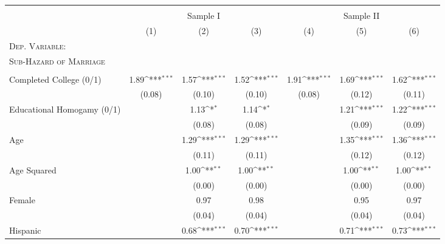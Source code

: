 {\def\sym#1{\ifmmode^{#1}\else\(^{#1}\)\fi}              \begin{tabular}{l*{6}{c}}                          \toprule  
\\[-1.8ex] & \multicolumn{3}{c}{Sample I} & \multicolumn{3}{c}{Sample II} \\ 
\cmidrule(lr){2-4} \cmidrule(lr){5-7} 			
		           &\multicolumn{1}{c}{(1)}  &\multicolumn{1}{c}{(2)}  &\multicolumn{1}{c}{(3)}     &\multicolumn{1}{c}{(4)} &\multicolumn{1}{c}{(5)} &\multicolumn{1}{c}{(6)}         \\             \midrule             \textsc{Dep. Variable:} & & & & & & \\\textsc{Sub-Hazard of Marriage} & & & & & & \\ & & & & & &\\
Completed College (0/1)&     1.89\sym{***}&     1.57\sym{***}&     1.52\sym{***}&     1.91\sym{***}&     1.69\sym{***}&     1.62\sym{***}\\
                &   (0.08)         &   (0.10)         &   (0.10)         &   (0.08)         &   (0.12)         &   (0.11)         \\
Educational Homogamy (0/1)&                  &     1.13\sym{*}  &     1.14\sym{*}  &                  &     1.21\sym{***}&     1.22\sym{***}\\
                &                  &   (0.08)         &   (0.08)         &                  &   (0.09)         &   (0.09)         \\
Age             &                  &     1.29\sym{***}&     1.29\sym{***}&                  &     1.35\sym{***}&     1.36\sym{***}\\
                &                  &   (0.11)         &   (0.11)         &                  &   (0.12)         &   (0.12)         \\
Age Squared     &                  &     1.00\sym{**} &     1.00\sym{**} &                  &     1.00\sym{**} &     1.00\sym{**} \\
                &                  &   (0.00)         &   (0.00)         &                  &   (0.00)         &   (0.00)         \\
Female          &                  &     0.97         &     0.98         &                  &     0.95         &     0.97         \\
                &                  &   (0.04)         &   (0.04)         &                  &   (0.04)         &   (0.04)         \\
Hispanic        &                  &     0.68\sym{***}&     0.70\sym{***}&                  &     0.71\sym{***}&     0.73\sym{***}\\

\end{tabular}}
